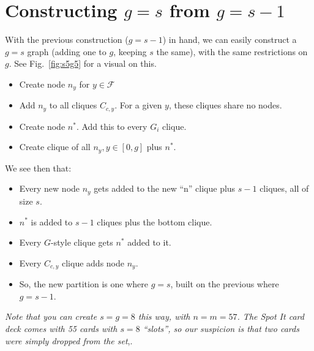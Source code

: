 \documentclass[11pt, oneside]{article} 	%
\begin{document}
\section{Constructing $g=s$ from $g=s-1$}

With the previous construction ($g=s-1$) in hand, we can easily construct a $g=s$ graph (adding one to $g$, keeping $s$ the same), with the same restrictions on $g$. See Fig.~\ref{fig:s5g5} for a visual on this.

\begin{itemize}
\item Create node $n_y$ for $y \in \mathcal{F}$
\item Add $n_y$ to all cliques $C_{c, y}$. For a given $y$, these cliques share no nodes.
\item Create node $n^*$. Add this to every $G_i$ clique.
\item Create clique of all $n_y, y \in [0, g]$ plus $n^*$.
\end{itemize}

We see then that:

\begin{itemize}
\item Every new node $n_y$ gets added to the new ``n'' clique plus $s-1$ cliques, all of size $s$.
\item $n^*$ is added to $s-1$ cliques plus the bottom clique.
\item Every $G$-style clique gets $n^*$ added to it.
\item Every $C_{c,y}$ clique adds node $n_y$.
\item So, the new partition is one where $g=s$, built on the previous where $g=s-1$.
\end{itemize}

\emph{Note that you can create $s=g=8$ this way, with $n=m=57$. The Spot It card deck comes with 55 cards with $s=8$ ``slots'', so our suspicion is that two cards were simply dropped from the set},.
\end{document}
